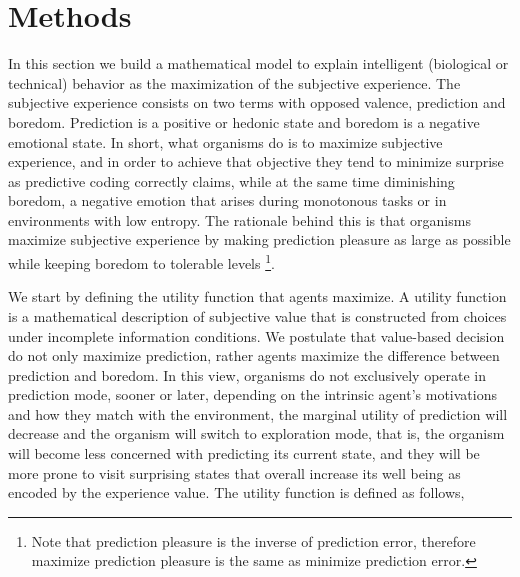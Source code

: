 \documentclass[11pt, onecolumn]{article}
\begin{document}
\section{Methods}
\label{se:methods}

In this section we build a mathematical model to explain intelligent (biological or technical) behavior as the maximization of the subjective experience. 
The subjective experience consists on two terms with opposed valence, prediction and boredom. Prediction is a positive or hedonic state and boredom is a negative emotional state. In short, what organisms do is to maximize subjective experience, and in order to achieve that objective  they tend to minimize surprise as predictive coding correctly claims, while at the same time diminishing boredom, a negative emotion that arises during monotonous tasks or in environments with low entropy. The rationale behind this is that organisms maximize subjective experience by making prediction pleasure as large as possible while keeping boredom to tolerable levels \footnote{Note that prediction pleasure is the inverse of prediction error, therefore maximize prediction pleasure is the same as minimize prediction error.}.


We start by defining the utility function that agents maximize. 
A utility function is a mathematical description of subjective value that is constructed from choices under incomplete information conditions. We postulate that value-based decision do not only maximize prediction, rather agents maximize the difference between prediction and boredom. In this view, organisms do not exclusively operate in prediction mode, sooner or later, depending on the intrinsic agent's motivations and how they match with the environment, the marginal utility of prediction will decrease and the organism will switch to exploration mode, that is, the organism will become less concerned with predicting its current state, and they will be more prone to visit surprising states that overall increase its well being as encoded by the experience value. 
The utility function is defined as follows,
\end{document}
